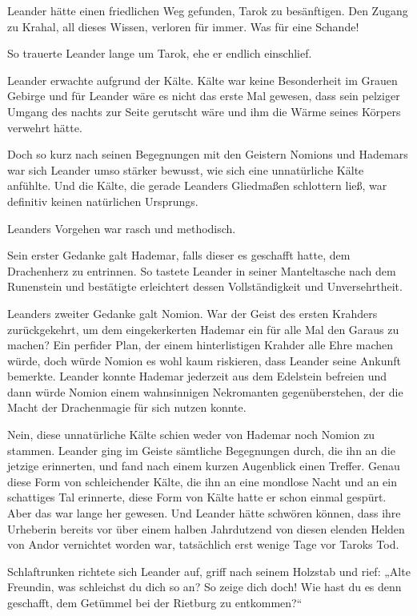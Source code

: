 Leander hätte einen friedlichen Weg gefunden, Tarok zu besänftigen. Den Zugang zu Krahal, all dieses Wissen, verloren für immer. Was für eine Schande!

So trauerte Leander lange um Tarok, ehe er endlich einschlief.\bigskip







Leander erwachte aufgrund der Kälte. Kälte war keine Besonderheit im Grauen Gebirge und für Leander wäre es nicht das erste Mal gewesen, dass sein pelziger Umgang des nachts zur Seite gerutscht wäre und ihm die Wärme seines Körpers verwehrt hätte.

Doch so kurz nach seinen Begegnungen mit den Geistern Nomions und Hademars war sich Leander umso stärker bewusst, wie sich eine unnatürliche Kälte anfühlte. Und die Kälte, die gerade Leanders Gliedmaßen schlottern ließ, war definitiv keinen natürlichen Ursprungs.

Leanders Vorgehen war rasch und methodisch.

Sein erster Gedanke galt Hademar, falls dieser es geschafft hatte, dem Drachenherz zu entrinnen. So tastete Leander in seiner Manteltasche nach dem Runenstein und bestätigte erleichtert dessen Vollständigkeit und Unversehrtheit.

Leanders zweiter Gedanke galt Nomion. War der Geist des ersten Krahders zurückgekehrt, um dem eingekerkerten Hademar ein für alle Mal den Garaus zu machen? Ein perfider Plan, der einem hinterlistigen Krahder alle Ehre machen würde, doch würde Nomion es wohl kaum riskieren, dass Leander seine Ankunft bemerkte. Leander konnte Hademar jederzeit aus dem Edelstein befreien und dann würde Nomion einem wahnsinnigen Nekromanten gegenüberstehen, der die Macht der Drachenmagie für sich nutzen konnte.

Nein, diese unnatürliche Kälte schien weder von Hademar noch Nomion zu stammen. Leander ging im Geiste sämtliche Begegnungen durch, die ihn an die jetzige erinnerten, und fand nach einem kurzen Augenblick einen Treffer. Genau diese Form von schleichender Kälte, die ihn an eine mondlose Nacht und an ein schattiges Tal erinnerte, diese Form von Kälte hatte er schon einmal gespürt. Aber das war lange her gewesen. Und Leander hätte schwören können, dass ihre Urheberin bereits vor über einem halben Jahrdutzend von diesen elenden Helden von Andor vernichtet worden war, tatsächlich erst wenige Tage vor Taroks Tod.

Schlaftrunken richtete sich Leander auf, griff nach seinem Holzstab und rief: „Alte Freundin, was schleichst du dich so an? So zeige dich doch! Wie hast du es denn geschafft, dem Getümmel bei der Rietburg zu entkommen?“

